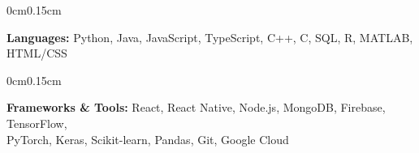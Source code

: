 \documentclass[10pt, letterpaper]{article}
\newenvironment{onecolentry}{
    \begin{adjustwidth}{0cm}{0.15cm}
}{
    \end{adjustwidth}
}
\begin{document}
    \begin{onecolentry}
        \textbf{Languages:} Python, Java, JavaScript, TypeScript, C++, C, SQL, R, MATLAB, HTML/CSS
    \end{onecolentry}

    \vspace{0.05cm}

    \begin{onecolentry}
        \textbf{Frameworks \& Tools:} React, React Native, Node.js, MongoDB, Firebase, TensorFlow,\\PyTorch, Keras, Scikit-learn, Pandas, Git, Google Cloud
    \end{onecolentry}
\end{document}
